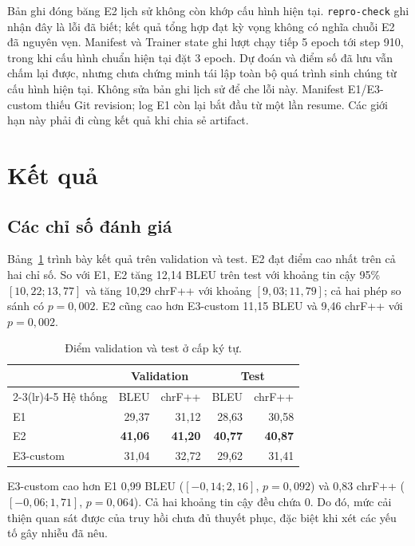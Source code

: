 \documentclass[11pt,twocolumn]{article}
\begin{document}
Bản ghi đóng băng E2 lịch sử không còn khớp cấu hình hiện tại.
\texttt{repro-check} ghi nhận đây là lỗi đã biết; kết quả tổng hợp đạt
kỳ vọng không có nghĩa chuỗi E2 đã nguyên vẹn. Manifest và Trainer state
ghi lượt chạy tiếp 5 epoch tới step 910, trong khi cấu hình chuẩn hiện tại
đặt 3 epoch. Dự đoán và điểm số đã lưu vẫn chấm lại được, nhưng chưa chứng
minh tái lập toàn bộ quá trình sinh chúng từ cấu hình hiện tại.
Không sửa bản ghi lịch sử để che lỗi này. Manifest E1/E3-custom thiếu
Git revision; log E1 còn lại bắt đầu từ một lần resume. Các giới hạn này
phải đi cùng kết quả khi chia sẻ artifact.



\section{Kết quả}

\subsection{Các chỉ số đánh giá}

Bảng~\ref{tab:main-results} trình bày kết quả trên validation và test. E2 đạt
điểm cao nhất trên cả hai chỉ số. So với E1, E2 tăng 12,14 BLEU trên test với
khoảng tin cậy 95\% $[10{,}22;13{,}77]$ và tăng 10,29 chrF++ với khoảng
$[9{,}03;11{,}79]$; cả hai phép so sánh có $p=0{,}002$. E2 cũng cao hơn
E3-custom 11,15 BLEU và 9,46 chrF++ với $p=0{,}002$.

\begin{table}[t]
\centering
\small
\caption{Điểm validation và test ở cấp ký tự.}
\label{tab:main-results}
\begin{tabular}{lrrrr}
\toprule
& \multicolumn{2}{c}{Validation} & \multicolumn{2}{c}{Test} \\
\cmidrule(lr){2-3}\cmidrule(lr){4-5}
Hệ thống & BLEU & chrF++ & BLEU & chrF++ \\
\midrule
E1 & 29,37 & 31,12 & 28,63 & 30,58 \\
E2 & \textbf{41,06} & \textbf{41,20} & \textbf{40,77} & \textbf{40,87} \\
E3-custom & 31,04 & 32,72 & 29,62 & 31,41 \\
\bottomrule
\end{tabular}
\end{table}

E3-custom cao hơn E1 0,99 BLEU ($[-0{,}14;2{,}16]$, $p=0{,}092$) và 0,83
chrF++ ($[-0{,}06;1{,}71]$, $p=0{,}064$). Cả hai khoảng tin cậy đều chứa 0.
Do đó, mức cải thiện quan sát được của truy hồi chưa đủ thuyết phục, đặc biệt
khi xét các yếu tố gây nhiễu đã nêu.
\end{document}
